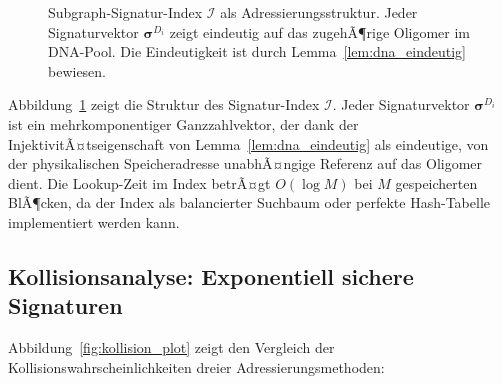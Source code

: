 ﻿\documentclass[a4paper,12pt]{article}
\theoremstyle{definition}
\theoremstyle{plain}
\begin{document}
\begin{figure}[H]
\centering
{}
\caption{Subgraph-Signatur-Index $\mathcal{I}$ als Adressierungsstruktur.
Jeder Signaturvektor $\boldsymbol{\sigma}^{D_i}$ zeigt eindeutig auf das
zugehÃ¶rige Oligomer im DNA-Pool.  Die Eindeutigkeit ist durch
Lemma~\ref{lem:dna_eindeutig} bewiesen.}
\label{fig:sig_index}
\end{figure}

Abbildung~\ref{fig:sig_index} zeigt die Struktur des Signatur-Index
$\mathcal{I}$.  Jeder Signaturvektor $\boldsymbol{\sigma}^{D_i}$ ist ein
mehrkomponentiger Ganzzahlvektor, der dank der InjektivitÃ¤tseigenschaft
von Lemma~\ref{lem:dna_eindeutig} als eindeutige, von der physikalischen
Speicheradresse unabhÃ¤ngige Referenz auf das Oligomer dient.
Die Lookup-Zeit im Index betrÃ¤gt $O(\log M)$ bei $M$ gespeicherten BlÃ¶cken,
da der Index als balancierter Suchbaum oder perfekte Hash-Tabelle implementiert
werden kann.

\subsection{Kollisionsanalyse: Exponentiell sichere Signaturen}

Abbildung~\ref{fig:kollision_plot} zeigt den Vergleich der
Kollisionswahrscheinlichkeiten dreier Adressierungsmethoden:
\end{document}

